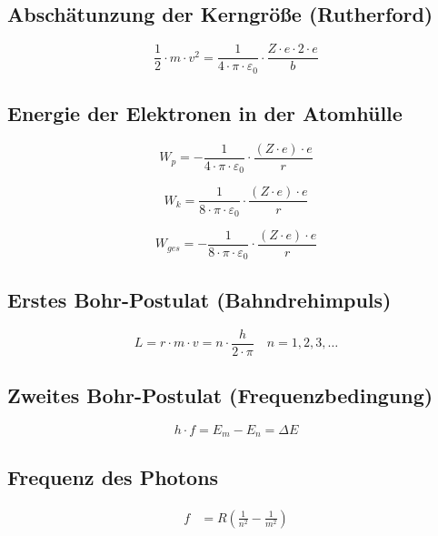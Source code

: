 
\subsection{Abschätunzung der Kerngröße (Rutherford)}
\begin{equation}\label{eq:kerngroesse:rutherford}
\frac{1}{2}\cdot m\cdot v^2 = \frac{1}{4\cdot \pi \cdot \varepsilon_0}\cdot\frac{Z\cdot e\cdot 2\cdot e}{b}
\end{equation}

\subsection{Energie der Elektronen in der Atomhülle}
\begin{equation}\label{eq:potentielle:energie:elektron:atomhuelle}
W_p = - \frac{1}{4\cdot\pi\cdot\varepsilon_0}\cdot \frac{\left(Z\cdot e\right)\cdot e}{r}
\end{equation}

\begin{equation}\label{eq:kinetische:energie:elektron:atomhuelle}
W_k = \frac{1}{8\cdot\pi\cdot\varepsilon_0}\cdot \frac{\left(Z\cdot e\right)\cdot e}{r}
\end{equation}

\begin{equation}\label{eq:gesamt:energie:elektron:atomhuelle}
W_{ges} = - \frac{1}{8\cdot\pi\cdot\varepsilon_0}\cdot \frac{\left(Z\cdot e\right)\cdot e}{r}
\end{equation}

\subsection{Erstes Bohr-Postulat (Bahndrehimpuls)}
\begin{equation}\label{eq:erstes:bohr:postulat:1}
L = r \cdot m \cdot v = n \cdot \frac{h}{2\cdot\pi} \quad n = 1, 2, 3, \ldots
\end{equation}

\subsection{Zweites Bohr-Postulat (Frequenzbedingung)}
\begin{equation}\label{eq:zweites:bohr-postulat}
h\cdot f = E_m - E_n = \Delta E
\end{equation}

\subsection{Frequenz des Photons}
\begin{equation}\label{eq:bohr:frequenz:photon}
\begin{split}
f &= R \left(\frac{1}{n^2}-\frac{1}{m^2}\right)
\end{split}
\end{equation}

